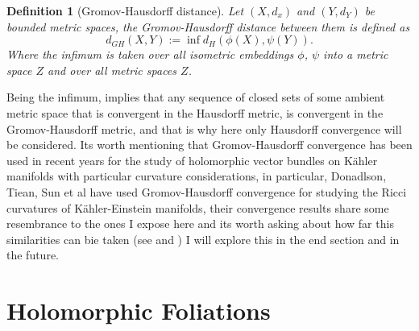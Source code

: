 \documentclass[12pt,twoside,a4paper]{report}
\newtheorem{definition}{Definition}[section]
\begin{document}
\begin{definition}[Gromov-Hausdorff distance]\label{Gromov-Hausdorff}
  Let $(X,d_{x})$ and $(Y,d_{Y})$ be bounded metric spaces, the Gromov-Hausdorff distance between them is defined as
  \begin{equation}
    d_{GH}(X,Y):=\inf d_{H}(\phi(X),\psi(Y)).
  \end{equation}
  Where the infimum is taken over all isometric embeddings $\phi$, $\psi$ into a metric space $Z$ and over all metric spaces $Z$.
\end{definition}
Being the infimum, implies that any sequence of closed sets of some ambient metric space that is convergent in the Hausdorff metric, is convergent in the Gromov-Hausdorff metric, and that is why here only Hausdorff convergence will be considered. Its worth mentioning that Gromov-Hausdorff convergence has been used in recent years for the study of holomorphic vector bundles on Kähler manifolds with particular curvature considerations, in particular, Donadlson, Tiean, Sun et al have used Gromov-Hausdorff convergence for studying the Ricci curvatures of Kähler-Einstein manifolds, their convergence results share some resembrance to the ones I expose here and its worth asking about how far this similarities can bie taken (see \cite{Donadlson-Sun} and \cite{tian}) I will explore this in the end section and in the future.

\section{Holomorphic Foliations}
\end{document}
